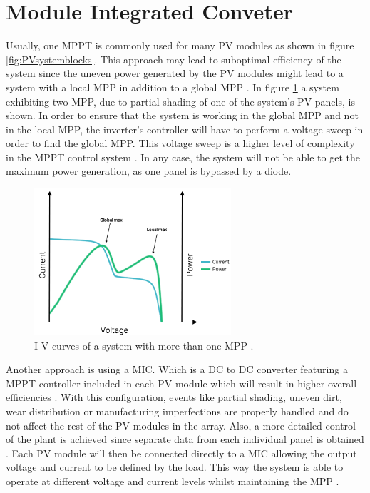 
\section{Module Integrated Conveter}

Usually, one MPPT is commonly used for many PV modules as shown in figure \ref{fig:PVsystemblocks}. This approach may lead to suboptimal efficiency of the system since the uneven power generated by the PV modules might lead to a system with a local MPP in addition to a global MPP \cite{AN1521_MC}. In figure \ref{multiple_local_MPP} a system exhibiting two MPP, due to partial shading of one of the system's PV panels, is shown. In order to ensure that the system is working in the global MPP and not in the local MPP, the inverter's controller will have to perform a voltage sweep in order to find the global MPP. This voltage sweep is a higher level of complexity in the MPPT control system \cite{AN1521_MC}. In any case, the system will not be able to get the maximum power generation, as one panel is bypassed by a diode.
\begin{figure}[H]
	\begin{center}
		\includegraphics[width=0.65\textwidth]{../Pictures/local_MPP}
		\caption{I-V curves of a system with more than one MPP \cite{local_mpp}.}
		\label{multiple_local_MPP}
	\end{center}	
\end{figure} 
Another approach is using a MIC. Which is a DC to DC converter featuring a MPPT controller included in each PV module which will result in higher overall efficiencies \cite{ArchitectureMIC}. With this configuration, events like partial shading, uneven dirt, wear distribution or manufacturing imperfections are properly handled and do not affect the rest of the PV modules in the array. Also, a more detailed control of the plant is achieved since separate data from each individual panel is obtained \cite{ArchitectureMIC}. Each PV module will then be connected directly to a MIC allowing the output voltage and current to be defined by the load. This way the system is able to operate at different voltage and current levels whilst maintaining the MPP \cite{ArchitectureMIC}.

